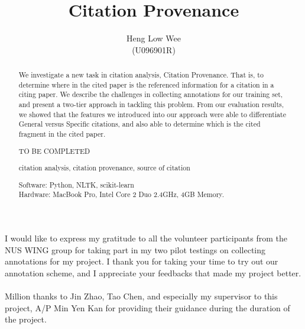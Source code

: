 \documentclass[hyp]{socreport}
\begin{document}
\title{Citation Provenance}
\author{Heng Low Wee \\ (U096901R)}
\maketitle
\begin{abstract}
\paragraph{}
We investigate a new task in citation analysis, Citation Provenance. That is, to determine where in the cited paper is the referenced information for a citation in a citing paper. We describe the challenges in collecting annotations for our training set, and present a two-tier approach in tackling this problem. From our evaluation results, we showed that the features we introduced into our approach were able to differentiate General versus Specific citations, and also able to determine which is the cited fragment in the cited paper.

\begin{descriptors}
	\item TO BE COMPLETED
\end{descriptors}
\begin{keywords}
	citation analysis, citation provenance, source of citation
\end{keywords}
\begin{implement}
\begin{flushleft}
\hspace{5 mm}Software: Python, NLTK, scikit-learn\\
\hspace{5 mm}Hardware: MacBook Pro, Intel Core 2 Duo 2.4GHz, 4GB Memory.
\end{flushleft}
\end{implement}
\end{abstract}

\begin{acknowledgement}
\paragraph{}
I would like to express my gratitude to all the volunteer participants from the NUS WING group for taking part in my two pilot testings on collecting annotations for my project. I thank you for taking your time to try out our annotation scheme, and I appreciate your feedbacks that made my project better.

\paragraph{}
Million thanks to Jin Zhao, Tao Chen, and especially my supervisor to this project, A/P Min Yen Kan for providing their guidance during the duration of the project.
\end{acknowledgement}

\listoffigures
\listoftables
\tableofcontents





 




\appendix

\end{document}

